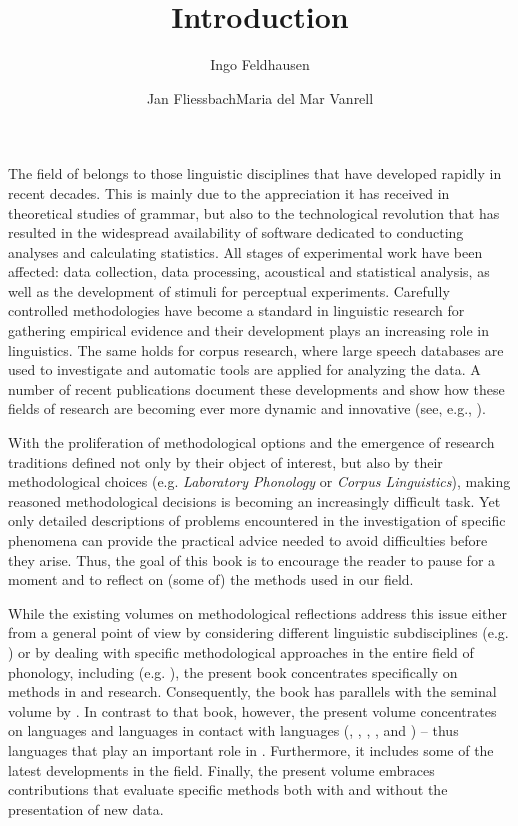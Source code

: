 \documentclass[output=paper]{langsci/langscibook}
\title{Introduction}
\author{Ingo Feldhausen\affiliation{Goethe-Universität Frankfurt am Main}\and Jan Fliessbach\affiliation{Freie Universität Berlin}\lastand Maria del Mar Vanrell\affiliation{Universitat de les Illes Balears}}
\begin{document}
\label{chap:intro}
The field of  belongs to those linguistic disciplines that have developed rapidly in recent decades. This is mainly due to the appreciation it has received in theoretical studies of grammar, but also to the technological revolution that has resulted in the widespread availability of software dedicated to conducting analyses and calculating statistics. All stages of experimental work have been affected: data collection, data processing, acoustical and statistical analysis, as well as the development of stimuli for perceptual experiments. Carefully controlled methodologies have become a standard in linguistic research for gathering empirical evidence and their development plays an increasing role in  linguistics. The same holds for corpus research, where large speech databases are used to investigate  and automatic tools are applied for analyzing the data. A number of recent publications document these developments and show how these fields of research are becoming ever more dynamic and innovative (see, e.g., \citealt{Sudhoff.2006,Cohn.2012,Durand.2014}). 

With the proliferation of methodological options and the emergence of research traditions defined not only by their object of interest, but also by their methodological choices (e.g. \textit{Laboratory Phonology} or \textit{Corpus Linguistics}), making reasoned methodological decisions is becoming an increasingly difficult task. Yet only detailed descriptions of problems encountered in the investigation of specific phenomena can provide the practical advice needed to avoid difficulties before they arise. Thus, the goal of this book is to encourage the reader to pause for a moment and to reflect on (some of) the methods used in our field.

While the existing volumes on methodological reflections address this issue either from a general point of view by considering different linguistic subdisciplines (e.g. \citealt{Ender.2012,Podesva.2013}) or by dealing with specific methodological approaches in the entire field of phonology, including  (e.g. \citealt{Cohn.2012,Nguyen.2013,Durand.2014}), the present book concentrates specifically on methods in  and  research. Consequently, the book has parallels with the seminal volume by \citet{Sudhoff.2006}. In contrast to that book, however, the present volume concentrates on  languages and languages in contact with  languages (, , , , and ) – thus languages that play an important role in . Furthermore, it includes some of the latest developments in the field. Finally, the present volume embraces contributions that evaluate specific methods both with and without the presentation of new data.
\end{document}
